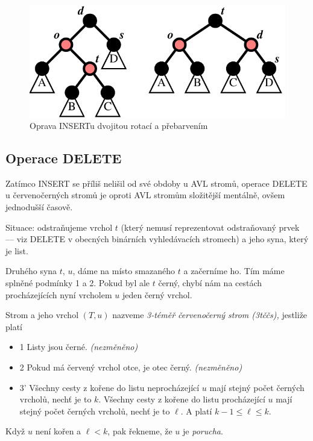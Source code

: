 \begin{enumerate}
\begin{enumerate}
\begin{figure}[!htb]
\centering\includegraphics{pics/rbt-i2b}
\caption{Oprava INSERTu dvojitou rotací a přebarvením}
\label{rbt-i2b}
\end{figure}

\end{enumerate}
\end{enumerate}

\subsection{Operace DELETE}
Zatímco INSERT se příliš nelišil od své obdoby u AVL stromů, operace
DELETE u červenočerných stromů je oproti AVL stromům složitější
mentálně, ovšem jednodušší časově.

Situace: odstraňujeme vrchol $t$ (který nemusí reprezentovat
odstraňovaný prvek --- viz DELETE v obecných binárních vyhledávacích
stromech) a jeho syna, který je list.

Druhého syna $t$, $u$, dáme na místo smazaného $t$ a začerníme ho. Tím
máme splněné podmínky 1 a 2. Pokud byl ale $t$ černý, chybí nám na
cestách procházejících nyní vrcholem $u$ jeden černý vrchol.
\begin{defn}
Strom a jeho vrchol $(T,u)$ nazveme \emph{3-téměř červenočerný strom
(3tččs),} jestliže platí
\begin{itemize}
\item{1} Listy jsou černé. {\it (nezměněno)}
\item{2} Pokud má červený vrchol otce, je otec černý. {\it (nezměněno)}
\item{3'}
Všechny cesty z kořene do listu neprocházející $u$ mají stejný počet
černých vrcholů, nechť je to $k$. 
Všechny cesty z kořene do listu   procházející $u$ mají stejný počet
černých vrcholů, nechť je to $\ell$. 
A platí $k-1 \leq \ell \leq k$.
\end{itemize}
Když $u$ není kořen a $\ell < k$, pak řekneme, že $u$ je \emph{porucha}.
\end{defn}

